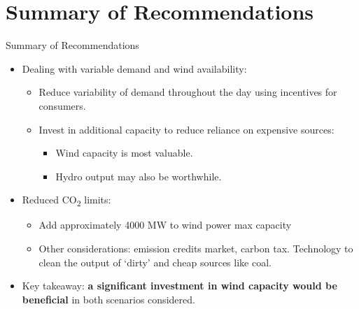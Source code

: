 \documentclass{beamer}
\begin{document}
    
  
    

	\section{Summary of Recommendations}
    
    
    \begin{frame}{Summary of Recommendations}
    
    	\begin{itemize}
        
        	\item Dealing with variable demand and wind availability:

                \begin{itemize}

                    \item Reduce variability of demand throughout the day using incentives for consumers.

                    \item Invest in additional capacity to reduce reliance on expensive sources:
                    
                    \begin{itemize}
                    	
                        \item Wind capacity is most valuable.
                        
                        \item Hydro output may also be worthwhile.
                        
                    \end{itemize}

                \end{itemize}
        
        	\item Reduced CO\textsubscript{2} limits:

                \begin{itemize}

                    \item Add approximately 4000 MW to wind power max capacity
                    
                    \item Other considerations: emission credits market, carbon tax.  Technology to clean the output of `dirty' and cheap sources like coal.

                \end{itemize}
        
        	\item Key takeaway: \textbf{a significant investment in wind capacity would be beneficial} in both scenarios considered.
        
        \end{itemize}
        
    \end{frame}
    
    
        
\end{document}
